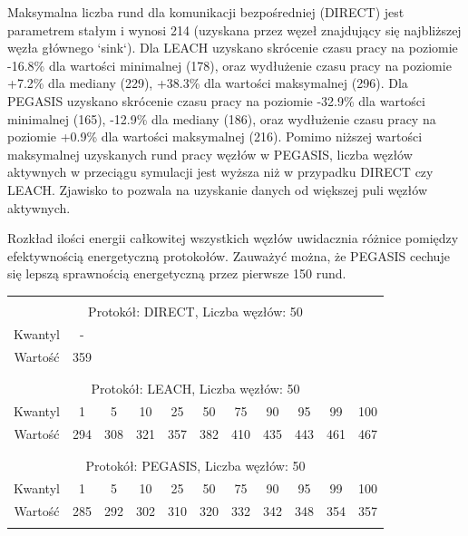 \documentclass[a4paper,12pt,twoside,openany]{report}
\begin{document}
\par
Maksymalna liczba rund dla komunikacji bezpośredniej (DIRECT) jest parametrem stałym i wynosi 214 (uzyskana przez węzeł znajdujący się najbliższej węzła głównego `sink`).
Dla LEACH uzyskano skrócenie czasu pracy na poziomie -16.8\% dla wartości minimalnej (178), oraz wydłużenie czasu pracy na poziomie +7.2\% dla mediany (229), +38.3\% dla wartości maksymalnej (296).
Dla PEGASIS uzyskano skrócenie czasu pracy na poziomie -32.9\% dla wartości minimalnej (165), -12.9\% dla mediany (186), oraz wydłużenie czasu pracy na poziomie +0.9\% dla wartości maksymalnej (216).
Pomimo niższej wartości maksymalnej uzyskanych rund pracy węzłów w PEGASIS, liczba węzłów aktywnych w przeciągu symulacji jest wyższa niż w przypadku DIRECT czy LEACH.
Zjawisko to pozwala na uzyskanie danych od większej puli węzłów aktywnych.
\par
Rozkład ilości energii całkowitej wszystkich węzłów uwidacznia różnice pomiędzy efektywnością energetyczną protokołów.
Zauważyć można, że PEGASIS cechuje się lepszą sprawnością energetyczną przez pierwsze 150 rund.

\begin{longtable}{*{11}{c}}
\toprule \\*
\multicolumn{11}{c}{Protokół: DIRECT, Liczba węzłów: 50} \\*
Kwantyl	& -	\\*
Wartość	& 359	\\*
\midrule \\*
\\*
\multicolumn{11}{c}{Protokół: LEACH, Liczba węzłów: 50} \\*
Kwantyl	& 1	& 5	& 10	& 25	& 50	& 75	& 90	& 95	& 99	& 100	\\*
Wartość	& 294	& 308	& 321	& 357	& 382	& 410	& 435	& 443	& 461	& 467	\\*
\midrule \\*
\\*
\multicolumn{11}{c}{Protokół: PEGASIS, Liczba węzłów: 50} \\*
Kwantyl	& 1	& 5	& 10	& 25	& 50	& 75	& 90	& 95	& 99	& 100	\\*
Wartość	& 285	& 292	& 302	& 310	& 320	& 332	& 342	& 348	& 354	& 357	\\*
\bottomrule \\*
\end{longtable}
\end{document}
